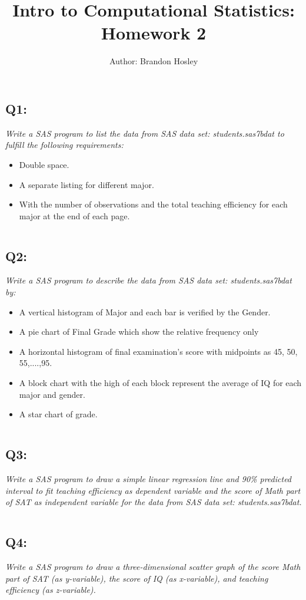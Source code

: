 \documentclass[a4paper,man,natbib]{apa6}
\title{Intro to Computational Statistics: Homework 2}
\author{Author: Brandon Hosley}
\affiliation{Instructor: Liang Kong, Ph.D}
\begin{document}
\maketitle
\singlespacing
	
\subsection*{Q1:}
\emph{Write a SAS program to list the data from SAS data set: students.sas7bdat to fulfill the following requirements:}
\begin{itemize}
	\itemsep-0.5em
	\item Double space.
	\item A separate listing for different major.
	\item With the number of observations and the total teaching efficiency for each major at the end of each page. 
\end{itemize}
	\inputminted[bgcolor=light-gray]{sas}{./Snippets/DAT502-HW2-1.sas}

\subsection*{Q2:}
\emph{Write a SAS program to describe the data from SAS data set: students.sas7bdat by:}
\begin{itemize}
	\itemsep-0.5em
	\item A vertical histogram of Major and each bar is verified by the Gender.
	\item A pie chart of Final Grade which show the relative frequency only
	\item A horizontal histogram of final examination's score with midpoints as 45, 50, 55,....,95.
	\item A block chart with the high of each block represent the average of IQ for each major and gender.
	\item A star chart of grade.
\end{itemize}
	\inputminted[bgcolor=light-gray]{sas}{./Snippets/DAT502-HW2-2.sas}

\subsection*{Q3:}
\emph{Write a SAS program to draw a simple linear regression line and 90\% predicted interval to fit teaching efficiency as dependent variable and the score of Math part of SAT as independent variable for the data from SAS data set: students.sas7bdat. }
	\inputminted[bgcolor=light-gray]{sas}{./Snippets/DAT502-HW2-3.sas}

\subsection*{Q4:}
\emph{Write a SAS program to draw a three-dimensional scatter graph of the score Math part of SAT (as y-variable), the score of IQ (as x-variable), and teaching efficiency (as z-variable).}
	\inputminted[bgcolor=light-gray]{sas}{./Snippets/DAT502-HW2-4.sas}


\end{document}
